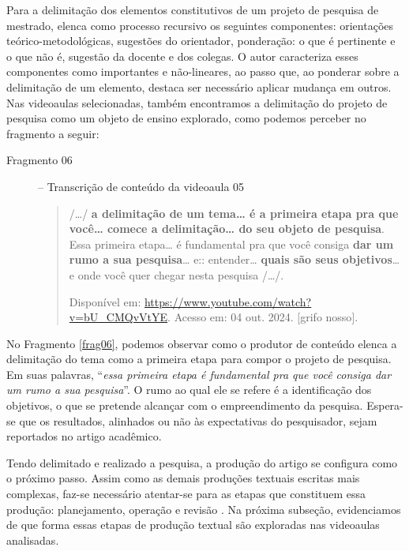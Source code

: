 Para a delimitação dos elementos constitutivos de um projeto de pesquisa
de mestrado, \textcite{silva2021} elenca como processo recursivo os seguintes
componentes: orientações teórico-metodológicas, sugestões do orientador,
ponderação: o que é pertinente e o que não é, sugestão da docente e dos
colegas. O autor caracteriza esses componentes como importantes e
não-lineares, ao passo que, ao ponderar sobre a delimitação de um
elemento, destaca ser necessário aplicar mudança em outros. Nas
videoaulas selecionadas, também encontramos a delimitação do projeto de
pesquisa como um objeto de ensino explorado, como podemos perceber no
fragmento a seguir:

\begin{description}
    \item[Fragmento 06\label{frag06}] -- Transcrição de conteúdo da videoaula 05

\begin{quote}
    /\ldots/ \textbf{a delimitação de um tema\ldots{} é a primeira etapa pra
que você\ldots{} comece a delimitação\ldots{} do seu objeto de
pesquisa}. Essa primeira etapa\ldots{} é fundamental pra que você
consiga \textbf{dar um rumo a sua pesquisa}\ldots{} e:: entender\ldots{}
\textbf{quais são seus objetivos}\ldots{} e onde você quer chegar nesta
pesquisa /\ldots/.

Disponível em:
\url{https://www.youtube.com/watch?v=bU_CMQvVtYE}.
Acesso em: 04 out. 2024. {[}grifo nosso{]}.
\end{quote}
\end{description}



No Fragmento \ref{frag06}, podemos observar como o produtor de conteúdo elenca a
delimitação do tema como a primeira etapa para compor o projeto de
pesquisa. Em suas palavras, ``\emph{essa primeira etapa é fundamental
pra que você consiga dar um rumo a sua pesquisa}''. O rumo
ao qual ele se refere é a identificação dos objetivos, o que se pretende
alcançar com o empreendimento da pesquisa. Espera-se que os resultados,
alinhados ou não às expectativas do pesquisador, sejam reportados no
artigo acadêmico.

Tendo delimitado e realizado a pesquisa, a produção do artigo se
configura como o próximo passo. Assim como as demais produções textuais
escritas mais complexas, faz-se necessário atentar-se para as etapas que
constituem essa produção: planejamento, operação e revisão \cite{antunes2003}. Na próxima subseção, evidenciamos de que forma essas etapas de
produção textual são exploradas nas videoaulas analisadas.

